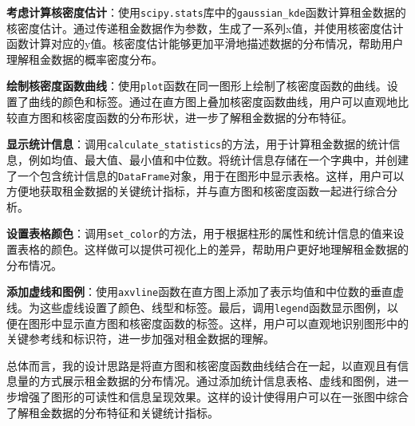 \documentclass[lang=cn,11pt,a4paper]{elegantpaper}
\begin{document}
\textbf{考虑计算核密度估计}：使用\lstinline{scipy.stats}库中的\lstinline{gaussian_kde}函数计算租金数据的核密度估计。通过传递租金数据作为参数，生成了一系列x值，并使用核密度估计函数计算对应的y值。核密度估计能够更加平滑地描述数据的分布情况，帮助用户理解租金数据的概率密度分布。

\textbf{绘制核密度函数曲线}：使用\lstinline{plot}函数在同一图形上绘制了核密度函数的曲线。设置了曲线的颜色和标签。通过在直方图上叠加核密度函数曲线，用户可以直观地比较直方图和核密度函数的分布形状，进一步了解租金数据的分布特征。

\textbf{显示统计信息}：调用\lstinline{calculate_statistics}的方法，用于计算租金数据的统计信息，例如均值、最大值、最小值和中位数。将统计信息存储在一个字典中，并创建了一个包含统计信息的\lstinline{DataFrame}对象，用于在图形中显示表格。这样，用户可以方便地获取租金数据的关键统计指标，并与直方图和核密度函数一起进行综合分析。

\textbf{设置表格颜色}：调用\lstinline{set_color}的方法，用于根据柱形的属性和统计信息的值来设置表格的颜色。这样做可以提供可视化上的差异，帮助用户更好地理解租金数据的分布情况。

\textbf{添加虚线和图例}：使用\lstinline{axvline}函数在直方图上添加了表示均值和中位数的垂直虚线。为这些虚线设置了颜色、线型和标签。最后，调用\lstinline{legend}函数显示图例，以便在图形中显示直方图和核密度函数的标签。这样，用户可以直观地识别图形中的关键参考线和标识符，进一步加强对租金数据的理解。

总体而言，我的设计思路是将直方图和核密度函数曲线结合在一起，以直观且有信息量的方式展示租金数据的分布情况。通过添加统计信息表格、虚线和图例，进一步增强了图形的可读性和信息呈现效果。这样的设计使得用户可以在一张图中综合了解租金数据的分布特征和关键统计指标。
\end{document}
